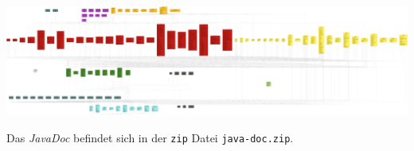 
$~$\newline

\includegraphics[width=\linewidth]{graphics/Klassendiagramm_png} \newline

Das \emph{JavaDoc} befindet sich in der \texttt{zip} Datei \texttt{java-doc.zip}.